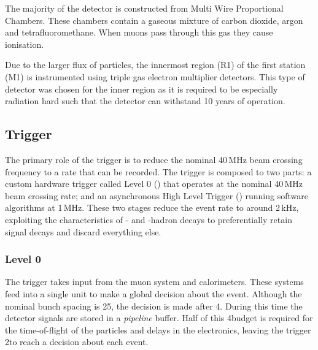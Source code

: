 The majority of the detector is constructed from Multi Wire Proportional Chambers. These chambers contain a gaseous mixture of carbon dioxide, argon and tetrafluoromethane. When muons pass through this gas they cause ionisation. 

Due to the larger flux of particles, the innermost region (R1) of the first station (M1) is instrumented using triple gas electron multiplier detectors. 
This type of detector was chosen for the inner region as it is required to be especially radiation hard such that the detector can withstand 10 years of operation.  

\subsection{Trigger}
\label{sec:Dec_trigger}

The primary role of the trigger is to reduce the nominal 40\,MHz beam crossing frequency to a rate that can be recorded. The trigger is composed to two parts: a custom hardware trigger called Level 0 (\lone) that operates at the nominal 40\,MHz beam crossing rate; and an asynchronous High Level Trigger (\hlt) running software algorithms at 1\,MHz. These two stages reduce the event rate to around 2\,kHz, exploiting the characteristics of \bquark- and \cquark-hadron decays to preferentially retain signal decays and discard everything else.

\subsubsection{Level 0}
The \lone trigger takes input from the muon system and calorimeters. These systems feed into a single unit to make a global decision about the event. Although the nominal bunch spacing is 25\ns, the \lone decision is made after 4\mus. During this time the detector signals are stored in a \emph{pipeline} buffer. Half of this 4\mus budget is required for the time-of-flight of the particles and delays in the electronics, leaving the \lone trigger 2\mus to reach a decision about each event.  

